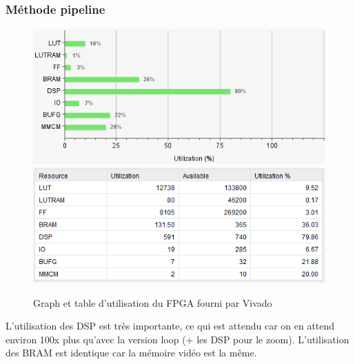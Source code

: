 \documentclass[LPSC_Labo03_SDeriaz]{subfiles}
\begin{document}
\subsubsection{Méthode pipeline}
\begin{figure}[H]
\centering
\includegraphics[scale=0.5]{utilisation_graph_pipeline.png}
\includegraphics[scale=0.5]{utilisation_table_pipeline.png}
\caption{Graph et table d'utilisation du FPGA fourni par Vivado}
\end{figure}
L'utilisation des DSP est très importante, ce qui est attendu car on en attend environ 100x plus qu'avec la version loop (+ les DSP pour le zoom). L'utilisation des BRAM est identique car la mémoire vidéo est la même.
\end{document}

